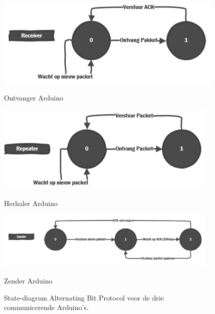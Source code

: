 \documentclass[a4paper,10pt]{article}
\begin{document}
\begin{figure}[ht!]
    \begin{minipage}{\textwidth}
        \begin{minipage}{0.49\textwidth}
            \centering
            \includegraphics[width=\textwidth]{receiver.png}
            \caption*{Ontvanger Arduino}
        \end{minipage}
        \hfill
        \begin{minipage}{0.49\textwidth}
            \centering
            \includegraphics[width=\textwidth]{repeater.png}
            \caption*{Herhaler Arduino}
        \end{minipage}
        \hfill\centering
        \begin{minipage}{0.8\textwidth}
            \centering
            \includegraphics[width=0.95\textwidth]{sender.png}
            \caption*{Zender Arduino}
        \end{minipage}
    \caption{State-diagram Alternating Bit Protocol voor de drie communicerende Arduino's.}
    \label{fig:roles}
    \end{minipage}
\end{figure}
\end{document}
